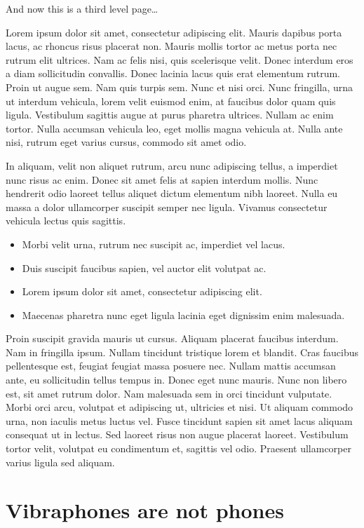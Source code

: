 \documentclass[11pt,oneside,openany]{book}
\begin{document}
And now this is a third level page\ldots{}

Lorem ipsum dolor sit amet, consectetur adipiscing elit. Mauris dapibus porta lacus, ac rhoncus risus placerat non. Mauris mollis tortor ac metus porta nec rutrum elit ultrices. Nam ac felis nisi, quis scelerisque velit. Donec interdum eros a diam sollicitudin convallis. Donec lacinia lacus quis erat elementum rutrum. Proin ut augue sem. Nam quis turpis sem. Nunc et nisi orci. Nunc fringilla, urna ut interdum vehicula, lorem velit euismod enim, at faucibus dolor quam quis ligula. Vestibulum sagittis augue at purus pharetra ultrices. Nullam ac enim tortor. Nulla accumsan vehicula leo, eget mollis magna vehicula at. Nulla ante nisi, rutrum eget varius cursus, commodo sit amet odio.

In aliquam, velit non aliquet rutrum, arcu nunc adipiscing tellus, a imperdiet nunc risus ac enim. Donec sit amet felis at sapien interdum mollis. Nunc hendrerit odio laoreet tellus aliquet dictum elementum nibh laoreet. Nulla eu massa a dolor ullamcorper suscipit semper nec ligula. Vivamus consectetur vehicula lectus quis sagittis.

\begin{itemize}
\item Morbi velit urna, rutrum nec suscipit ac, imperdiet vel lacus.
\item Duis suscipit faucibus sapien, vel auctor elit volutpat ac.
\item Lorem ipsum dolor sit amet, consectetur adipiscing elit.
\item Maecenas pharetra nunc eget ligula lacinia eget dignissim enim malesuada.
\end{itemize}

Proin suscipit gravida mauris ut cursus. Aliquam placerat faucibus interdum. Nam in fringilla ipsum. Nullam tincidunt tristique lorem et blandit. Cras faucibus pellentesque est, feugiat feugiat massa posuere nec. Nullam mattis accumsan ante, eu sollicitudin tellus tempus in. Donec eget nunc mauris. Nunc non libero est, sit amet rutrum dolor. Nam malesuada sem in orci tincidunt vulputate. Morbi orci arcu, volutpat et adipiscing ut, ultricies et nisi. Ut aliquam commodo urna, non iaculis metus luctus vel. Fusce tincidunt sapien sit amet lacus aliquam consequat ut in lectus. Sed laoreet risus non augue placerat laoreet. Vestibulum tortor velit, volutpat eu condimentum et, sagittis vel odio. Praesent ullamcorper varius ligula sed aliquam.			

\chapter{Vibraphones are not phones}\hypertarget{vibraphones-are-not-phones}{}\label{vibraphones-are-not-phones}
\end{document}
